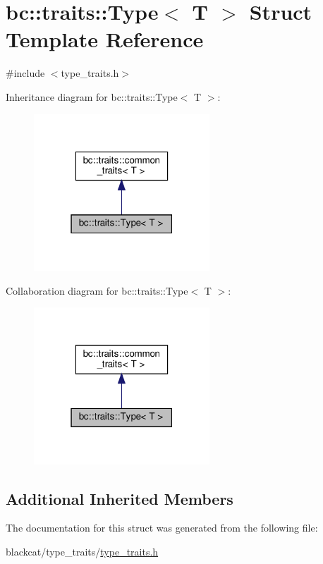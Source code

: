 \hypertarget{structbc_1_1traits_1_1Type}{}\section{bc\+:\+:traits\+:\+:Type$<$ T $>$ Struct Template Reference}
\label{structbc_1_1traits_1_1Type}


{\ttfamily \#include $<$type\+\_\+traits.\+h$>$}



Inheritance diagram for bc\+:\+:traits\+:\+:Type$<$ T $>$\+:\nopagebreak
\begin{figure}[H]
\begin{center}
\leavevmode
\includegraphics[width=187pt]{structbc_1_1traits_1_1Type__inherit__graph}
\end{center}
\end{figure}


Collaboration diagram for bc\+:\+:traits\+:\+:Type$<$ T $>$\+:\nopagebreak
\begin{figure}[H]
\begin{center}
\leavevmode
\includegraphics[width=187pt]{structbc_1_1traits_1_1Type__coll__graph}
\end{center}
\end{figure}
\subsection*{Additional Inherited Members}


The documentation for this struct was generated from the following file\+:\begin{DoxyCompactItemize}
\item 
blackcat/type\+\_\+traits/\hyperlink{type__traits_2type__traits_8h}{type\+\_\+traits.\+h}\end{DoxyCompactItemize}
